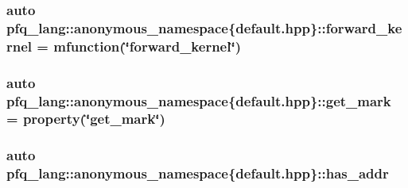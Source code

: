\hypertarget{namespacepfq__lang_1_1anonymous__namespace_02default_8hpp_03_a453450a8ebf5660ab590a3ffb79057e1}{
\subsubsection[{forward\+\_\+kernel}]{\setlength{\rightskip}{0pt plus 5cm}auto pfq\+\_\+lang\+::anonymous\+\_\+namespace\{default.\+hpp\}\+::forward\+\_\+kernel = {\bf mfunction}(\char`\"{}forward\+\_\+kernel\char`\"{})}}\label{namespacepfq__lang_1_1anonymous__namespace_02default_8hpp_03_a453450a8ebf5660ab590a3ffb79057e1}
\hypertarget{namespacepfq__lang_1_1anonymous__namespace_02default_8hpp_03_a85f5de783fc38d6c0539f1f4afac189b}{
\subsubsection[{get\+\_\+mark}]{\setlength{\rightskip}{0pt plus 5cm}auto pfq\+\_\+lang\+::anonymous\+\_\+namespace\{default.\+hpp\}\+::get\+\_\+mark = {\bf property}(\char`\"{}get\+\_\+mark\char`\"{})}}\label{namespacepfq__lang_1_1anonymous__namespace_02default_8hpp_03_a85f5de783fc38d6c0539f1f4afac189b}
\hypertarget{namespacepfq__lang_1_1anonymous__namespace_02default_8hpp_03_ac3ef3eefe441b183db012637b4459836}{
\subsubsection[{has\+\_\+addr}]{\setlength{\rightskip}{0pt plus 5cm}auto pfq\+\_\+lang\+::anonymous\+\_\+namespace\{default.\+hpp\}\+::has\+\_\+addr}}\label{namespacepfq__lang_1_1anonymous__namespace_02default_8hpp_03_ac3ef3eefe441b183db012637b4459836}
